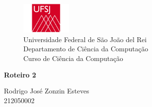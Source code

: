 \begin{figure}[t]
	\centering
	\includegraphics[width=2.5cm]{ufsj}\\
	
	{\large Universidade Federal de São João del Rei\\
		Departamento de Ciência da Computação\\
		Curso de Ciência da Computação\\}
	\label{fig:ufsj}
\end{figure}
{\Large
	\begin{center}
		\textbf{Roteiro 2}
		
	\end{center}
}

{\large 
	
	\begin{center}
		Rodrigo José Zonzin Esteves \\
		212050002
	\end{center}	
}